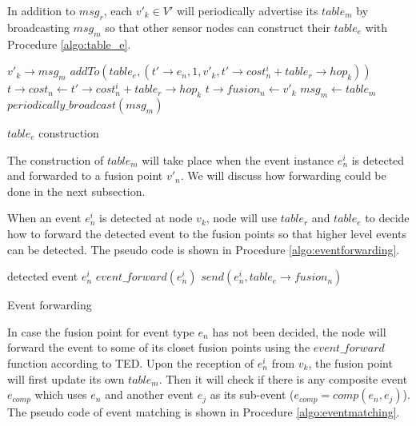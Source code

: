 In addition to \(msg_r\), each \(v'_k\in V'\) will periodically advertise its \(table_m\) by broadcasting \(msg_m\) so that other sensor nodes can construct their \(table_e\) with Procedure \ref{algo:table_e}.

\begin{algorithm}
\begin{algorithmic}
\REQUIRE \(v'_k\rightarrow msg_m\)
			\STATE \(addTo(table_e, (t'\rightarrow e_n, 1, v'_k, t'\rightarrow cost_n^i+table_r\rightarrow hop_k))\)
		\ENDIF
					\STATE \(t\rightarrow cost_n \gets t'\rightarrow cost_n^i+table_r\rightarrow hop_k\)
					\STATE \(t\rightarrow fusion_n \gets v'_k\)
				\ENDIF
			\ENDIF
		\ENDFOR
	\ENDFOR
		\STATE \(msg_m \gets table_m\)
		\STATE \(periodically\_broadcast(msg_m)\)
	\ENDIF
\end{algorithmic}
\caption{\(table_e\) construction}
\label{algo:table_e}
\end{algorithm}

The construction of \(table_m\) will take place when the event instance \(e_n^i\) is detected and forwarded to a fusion point \(v'_n\). We will discuss how forwarding could be done in the next subsection.

When an event \(e_n^i\) is detected at node \(v_k\), node will use \(table_r\) and \(table_e\) to decide how to forward the detected event to the fusion points so that higher level events can be detected. The pseudo code is shown in Procedure \ref{algo:eventforwarding}.

\begin{algorithm}
\begin{algorithmic}
\REQUIRE detected event \(e_n^i\)
		\STATE \(event\_forward(e_n^i)\)
	\ELSE
		\STATE \(send(e_n^i, table_e\rightarrow fusion_n)\)
	\ENDIF
\end{algorithmic}
\caption{Event forwarding}
\label{algo:eventforwarding}
\end{algorithm}

In case the fusion point for event type \(e_n\) has not been decided, the node will forward the event to some of its closet fusion points using the \(event\_forward\) function according to TED. Upon the reception of \(e_n^i\) from \(v_k\), the fusion point will first update its own \(table_m\). Then it will check if there is any composite event \(e_{comp}\) which uses \(e_n\) and another event \(e_j\) as its sub-event (\(e_{comp}=comp(e_n, e_j)\)). The pseudo code of event matching is shown in Procedure \ref{algo:eventmatching}.

